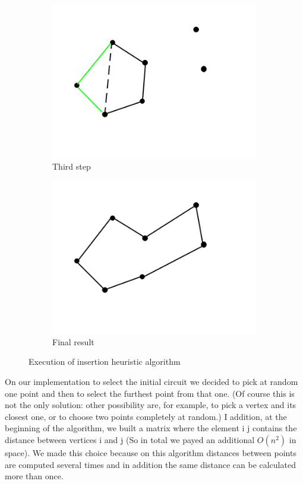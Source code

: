 \begin{figure}[h!]
\begin{subfigure}[b]{0.4\linewidth}
    \includegraphics[width=\linewidth]{media/insertion3.png}
    \caption{Third step}
  \end{subfigure}
  \begin{subfigure}[b]{0.4\linewidth}
    \includegraphics[width=\linewidth]{media/insertion4.png}
    \caption{Final result}
  \end{subfigure}
  \caption{Execution of insertion heuristic algorithm}
\end{figure}

\noindent On our implementation to select the initial circuit we decided to pick at random one point and then to select the furthest point from that one. (Of course this is not the only solution: other possibility are, for example, to pick a vertex and its closest one, or to choose two points completely at random.) I addition, at the beginning of the algorithm, we built a matrix where the element i j contains the distance between vertices i and j (So in total we payed an additional $O(n^2)$ in space). We made this choice because on this algorithm distances between points are computed several times and in addition the same distance can be calculated more than once.\\


